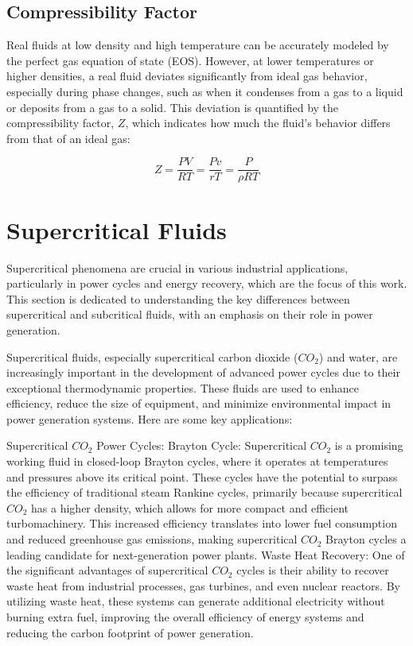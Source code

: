 	\subsection{Compressibility Factor}

	Real fluids at low density and high temperature can be accurately modeled by
	the perfect gas equation of state (EOS). However, at lower temperatures or
	higher densities, a real fluid deviates significantly from ideal gas
	behavior, especially during phase changes, such as when it condenses from a
	gas to a liquid or deposits from a gas to a solid. This deviation is
	quantified by the compressibility factor, $Z$, which indicates how much the
	fluid's behavior differs from that of an ideal gas:

	\begin{equation}
		Z = \frac{PV}{RT} =\frac{Pv}{rT} = \frac{P}{\rho RT} 
	\end{equation}

\section{Supercritical Fluids}

Supercritical phenomena are crucial in various industrial applications,
particularly in power cycles and energy recovery, which are the focus of this
work. This section is dedicated to understanding the key differences between
supercritical and subcritical fluids, with an emphasis on their role in power
generation.

Supercritical fluids, especially supercritical carbon dioxide ($CO_2$) and water,
are increasingly important in the development of advanced power cycles due to
their exceptional thermodynamic properties. These fluids are used to enhance
efficiency, reduce the size of equipment, and minimize environmental impact in
power generation systems. Here are some key applications:

    Supercritical $CO_2$ Power Cycles: Brayton Cycle: Supercritical $CO_2$ is a
        promising working fluid in closed-loop Brayton cycles, where it operates
        at temperatures and pressures above its critical point. These cycles
        have the potential to surpass the efficiency of traditional steam
        Rankine cycles, primarily because supercritical $CO_2$ has a higher
        density, which allows for more compact and efficient turbomachinery.
        This increased efficiency translates into lower fuel consumption and
        reduced greenhouse gas emissions, making supercritical $CO_2$ Brayton
        cycles a leading candidate for next-generation power plants. Waste Heat
        Recovery: One of the significant advantages of supercritical $CO_2$ cycles
        is their ability to recover waste heat from industrial processes, gas
        turbines, and even nuclear reactors. By utilizing waste heat, these
        systems can generate additional electricity without burning extra fuel,
        improving the overall efficiency of energy systems and reducing the
        carbon footprint of power generation.

